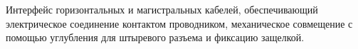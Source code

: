 Интерфейс горизонтальных и магистральных кабелей, 
обеспечивающий электрическое соединение контактом
проводником, механическое совмещение с помощью
углубления для штыревого разъема и фиксацию защелкой.